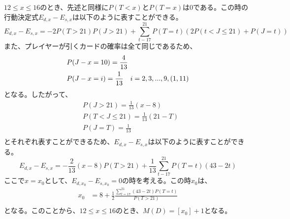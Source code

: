         \subsubsection{}
            $12\leq x \leq 16$のとき、先述と同様に$P(T < x)$と$P(T = x)$は0である。この時の行動決定式$E_{d,x} - E_{s,x}$は以下のように表すことができる。
            \begin{displaymath}
                E_{d,x} - E_{s,x} = -2P(T>21)P(J>21) + \sum_{t-17}^{21}P(T=t)(2P(t<J\leq21) + P(J=t))
            \end{displaymath}
            また、プレイヤーが引くカードの確率は全て同じであるため、
            \begin{eqnarray}
                \begin{split}
                    &P(J-x=10)=\frac{4}{13} \notag\\
                    &P(J-x=i)=\frac{1}{13} \quad i=2,3,...,9,(1,11) \notag
                \end{split}
            \end{eqnarray}
            となる。したがって、
            \begin{displaymath}
                \begin{split}
                    &P(J>21)=\frac{1}{13}(x-8)\\
                    &P(T<J\leq21)=\frac{1}{13}(21-T)\\
                    &P(J=T)=\frac{1}{13}\\
                \end{split}
            \end{displaymath}
                とそれぞれ表すことができるため、$E_{d,x} - E_{s,x}$は以下のように表すことができる。
            \begin{displaymath}
                E_{d,x} - E_{s,x} = -\frac{2}{13}(x-8)P(T>21)+\frac{1}{13}\sum_{t-17}^{21}P(T=t)(43-2t)
            \end{displaymath}
            ここで$x=x_0$として、$E_{d,x_0} - E_{s,x_0}=0$の時を考える。この時$x_0$は、
            \begin{displaymath}
                \begin{split}
                    x_0&=8+\frac{1}{2}\frac{\sum_{t=17}^{21}(43-2t)P(T=t)}{P(T>21)}\\
                \end{split}
            \end{displaymath}
            となる。このことから、$12\leq x\leq 16$のとき、$M(D)=[x_0]+1$となる。
